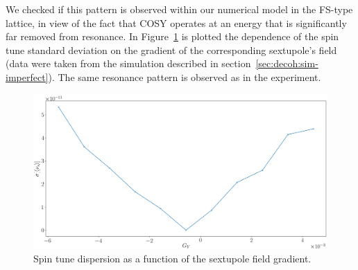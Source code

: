 We checked if this pattern is observed within our numerical model in the FS-type lattice, in view of the 
fact that COSY operates at an energy that is significantly far removed from resonance. 
In Figure~\ref{fig:SCT_resonance} is plotted the dependence of the spin tune standard deviation 
on the gradient of the corresponding sextupole's field 
(data were taken from the simulation described in section~\ref{sec:decoh:sim-imperfect}).
The same resonance pattern is observed as in the experiment.

\begin{figure}[h]
	\centering
	\includegraphics[width=\linewidth]{images/decoh_sim/stune_sd_vs_sext_strength_resonance}
	\caption{Spin tune dispersion as a function of the sextupole field gradient.\label{fig:SCT_resonance}}
\end{figure}

